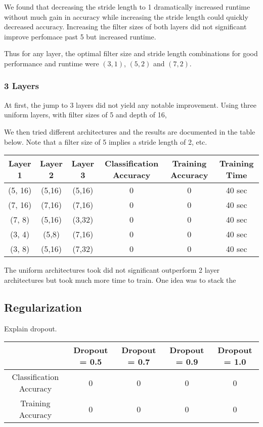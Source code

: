 \documentclass[10pt,twoside]{article}
\begin{document}
 We found that decreasing the stride length to 1 dramatically increased runtime without much gain in accuracy while increasing the stride length could quickly decreased accuracy. Increasing the filter sizes of both layers did not significant improve perfomace past 5 but increased runtime.

Thus for any layer, the optimal filter size and stride length combinations for good performance and runtime were $(3,1)$, $(5,2)$ and $(7,2)$.

\subsubsection{3 Layers}
At first, the jump to 3 layers did not yield any notable improvement. Using three uniform layers, with filter sizes of 5 and depth of 16, 

We then tried different architectures and the results are documented in the table below. Note that a filter size of 5 implies a stride length of 2, etc.

\begin{center}
 \begin{tabular}{||c c c c c c||} 
 \hline
 Layer 1 & Layer 2 & Layer 3 & Classification Accuracy & Training Accuracy & Training Time \\ [0.5ex] 
 \hline\hline
 (5, 16) & (5,16) & (5,16) & 0 & 0 & 40 sec \\ 
 \hline
 (7, 16) & (7,16) & (7,16) & 0 & 0 & 40 sec \\ 
 \hline
 (7, 8)  & (5,16) & (3,32) & 0 & 0 & 40 sec \\ 
 \hline
 (3, 4)  & (5,8) & (7,16) & 0 & 0 & 40 sec \\ 
 \hline
 (3, 8)  & (5,16) & (7,32) & 0 & 0 & 40 sec \\ 
 \hline
\end{tabular}
\end{center}

The uniform architectures took did not significant outperform 2 layer architectures but took much more time to train. One idea was to stack the 

\subsection{Regularization}

Explain dropout.

\begin{center}
 \begin{tabular}{||c c c c c||} 
 \hline
  & Dropout = 0.5 & Dropout = 0.7 & Dropout = 0.9  & Dropout = 1.0 \\ [0.5ex] 
 \hline\hline
 Classification Accuracy & 0 & 0 & 0 & 0 \\ 
 \hline
 Training Accuracy       & 0 & 0 & 0 & 0 \\
 \hline
\end{tabular}
\end{center}
\end{document}
